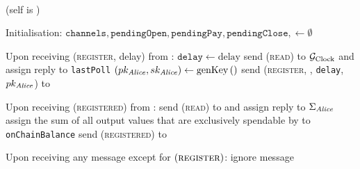 \ \\  (self is \alice)
  \label{alg:lightningprot}
  \begin{algorithmic}[1]
    \State Initialisation:
    \Indent
      \State $\mathtt{channels}, \mathtt{pendingOpen}, \mathtt{pendingPay},
      \mathtt{pendingClose}, \gets \emptyset$
    \EndIndent
    \State

    \State Upon receiving (\textsc{register}, delay) from \environment:
    \Indent
      \State $\mathtt{delay} \gets \mathrm{delay}$
      \State send (\textsc{read}) to $\mathcal{G}_{\mathrm{Clock}}$ and assign reply to
      \texttt{lastPoll}
      \State $\left(pk_{\mathit{Alice}}, sk_{\mathit{Alice}}\right) \gets
      \mathrm{genKey}\left(\right)$
      \State send (\textsc{register}, \alice, \texttt{delay},
      $pk_{\mathit{Alice}}$) to \adversary {}
    \EndIndent
    \State

    \State Upon receiving (\textsc{registered}) from \adversary:
    \Indent
      \State send (\textsc{read}) to \ledger{} and assign reply to
      $\Sigma_{\mathit{Alice}}$
      \State assign the sum of all output values that are exclusively spendable
      by \alice{} to \texttt{onChainBalance}
      \State send (\textsc{registered}) to \environment
    \EndIndent
    \State

    \State Upon receiving any message except for
    $\left(\textsc{register}\right)$:
    \Indent
        \State ignore message
      \EndIf
    \EndIndent
    \State


\end{algorithmic}
